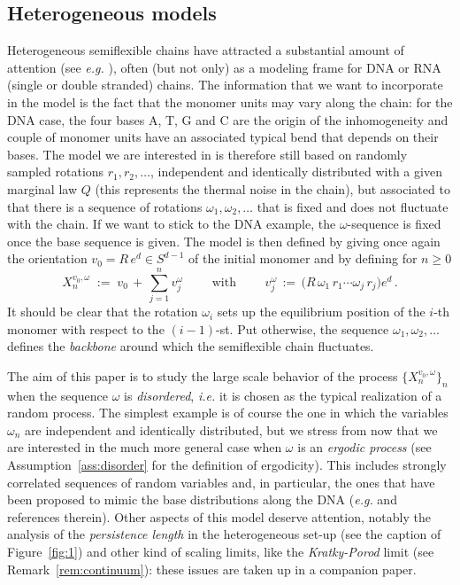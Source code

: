 \documentclass[a4paper,reqno,11pt]{amsart}
\numberwithin{equation}{section}
\newcommand{\go}{\omega}
\begin{document}

\smallskip

\subsection{Heterogeneous models}
Heterogeneous semiflexible chains have attracted a substantial
amount of attention (see {\sl e.g.} \cite{cf:BDM,cf:MN,cf:Vaillant,cf:WN,cf:ZC}),
often (but not only) as  a  modeling frame  for DNA or RNA (single or double stranded) chains.
The information that we want to incorporate in the model
is the fact that the monomer units may vary along the chain:
for the DNA case, the four bases A, T, G and C are the origin
of the inhomogeneity and couple of monomer units  have an associated typical bend
that depends on their bases. The model we are interested
in is therefore still based on randomly sampled rotations $r_1, r_2, \ldots$,
independent and identically distributed with a given marginal law $Q$
(this represents the thermal noise in the chain), but associated to that there is a sequence
of rotations $\go_1, \go_2,\ldots$ that is fixed and does not
fluctuate with the chain. If we want to stick to the  DNA example,
the $\go$-sequence is fixed once the base sequence is given.
The model is then defined by giving once again the orientation
$v_0 = R \, e^d \in S^{d-1}$
of the initial monomer and by defining for $n \ge 0$
\begin{equation} \label{eq:X}
X_n^{v_0, \go} \; := \; v_0 \,+\, \sum_{j=1}^n v_j^\go \qquad \text{ with } \qquad
v_j^\go\, :=\,  \big( R \,\go_1\, r_1 \cdots \go_j \, r_j \big) e^d \,.
\end{equation}
It should be clear that the rotation $\go_i$ sets up the equilibrium position
of the $i$-th monomer with respect to the $(i-1)$-st. Put otherwise, the
sequence $\go_1, \go_2, \ldots$ defines the {\sl backbone} around which the semiflexible
chain fluctuates.

\smallskip

The aim of this paper is to study
the large scale behavior of the process $\{X_n^{v_0, \go}\}_{n}$ when the sequence
$\go$ is {\sl disordered}, {\sl i.e.} it is chosen as the typical
realization of a random process. The simplest example
is of course the one in which the variables $\go_n$ are independent
and identically distributed, but we stress from now that
we are interested in the much more general case when $\go$ is an
{\sl ergodic process} (see Assumption~\ref{ass:disorder} for
the definition of ergodicity). This includes strongly correlated
sequences of random variables and, in particular, the ones that
have been proposed to mimic the base distributions along the DNA
({\sl e.g.} \cite{cf:Vaillant} and references therein).
Other aspects of this model deserve attention, notably the analysis
of the {\sl persistence length} in the heterogeneous set-up
(see the caption of Figure~\ref{fig:1})
and other kind of scaling limits, like the {\sl Kratky-Porod} limit
(see Remark~\ref{rem:continuum}):
these issues are taken up in a companion paper.
\end{document}
